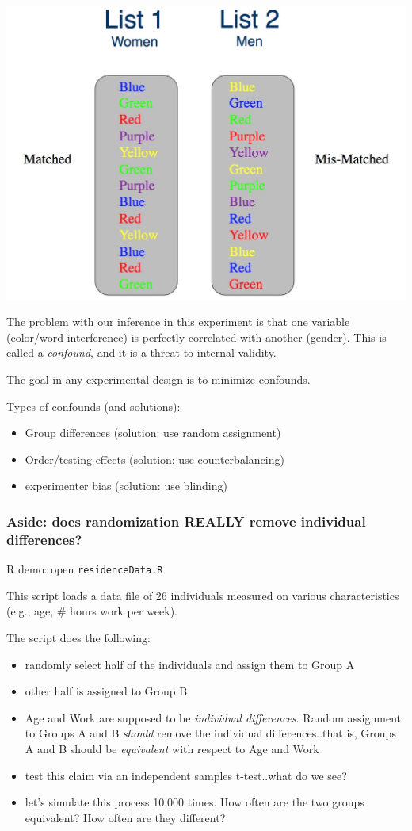 \documentclass[11pt]{article}
\begin{document}
\includegraphics[width=.9\linewidth]{figures/compare.jpg}

The problem with our inference in this experiment is that one variable (color/word interference) is perfectly correlated with another (gender).  This is called a \emph{confound}, and it is a threat to internal validity.

The goal in any experimental design is to minimize confounds.

Types of confounds (and solutions):
\begin{itemize}
\item Group differences (solution: use random assignment)
\item Order/testing effects (solution: use counterbalancing)
\item experimenter bias (solution: use blinding)
\end{itemize}

\subsubsection*{Aside: does randomization REALLY remove individual differences?}
\label{sec-1-1-2}

R demo: open \verb~residenceData.R~  

This script loads a data file of 26 individuals measured on various characteristics (e.g., age, \# hours work per week).

The script does the following:
\begin{itemize}
\item randomly select half of the individuals and assign them to Group A
\item other half is assigned to Group B
\item Age and Work are supposed to be \emph{individual differences}.  Random assignment to Groups A and B \emph{should} remove the individual differences..that is, Groups A and B should be \emph{equivalent} with respect to Age and Work
\item test this claim via an independent samples t-test..what do we see?
\item let's simulate this process 10,000 times.  How often are the two groups equivalent?  How often are they different?
\end{itemize}
\end{document}
